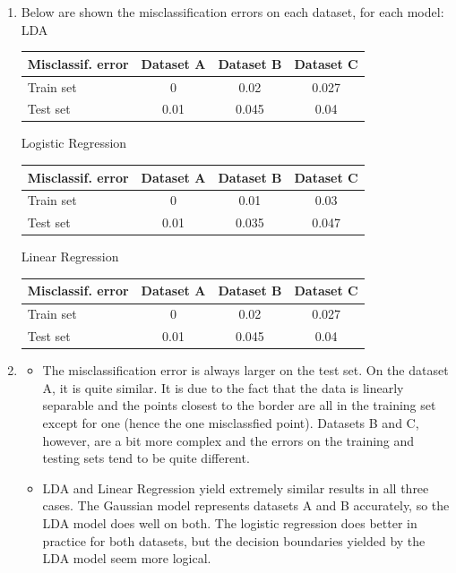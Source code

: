 \documentclass[a4paper, 11pt]{article}
\begin{document}
\begin{enumerate}[label=\alph*]
    \item Below are shown the misclassification errors on each dataset, for each model: \\
    
    LDA \hfill
    \begin{tabular}{ | l | *{3}{| c} | }
         \hline
            Misclassif. error & Dataset A & Dataset B & Dataset C \\
         \hline
            Train set & 0    & 0.02  & 0.027 \\
            Test set  & 0.01 & 0.045 & 0.04  \\
         \hline
     \end{tabular}
    
    Logistic Regression \hfill
    \begin{tabular}{ | l | *{3}{| c} | }
         \hline
            Misclassif. error & Dataset A & Dataset B & Dataset C \\
         \hline
           Train set & 0    & 0.01  & 0.03  \\
           Test set  & 0.01 & 0.035 & 0.047 \\
         \hline
     \end{tabular}
    
    Linear Regression \hfill
    \begin{tabular}{ | l | *{3}{| c} | }
         \hline
            Misclassif. error & Dataset A & Dataset B & Dataset C \\
         \hline
           Train set & 0    & 0.02  & 0.027 \\
           Test set  & 0.01 & 0.045 & 0.04  \\
         \hline
    \end{tabular}
    
    \item \begin{itemize}
        \item The misclassification error is always larger on the test set. On the dataset A, it is quite similar. It is due to the fact that the data is linearly separable and the points closest to the border are all in the training set except for one (hence the one misclassfied point). Datasets B and C, however, are a bit more complex and the errors on the training and testing sets tend to be quite different.
        
        \item LDA and Linear Regression yield extremely similar results in all three cases. The Gaussian model represents datasets A and B accurately, so the LDA model does well on both. The logistic regression does better in practice for both datasets, but the decision boundaries yielded by the LDA model seem more logical.
        
    \end{itemize}
\end{enumerate}
\end{document}
